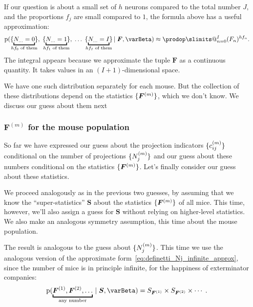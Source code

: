 \documentclass[\ifafour a4paper,12pt,\else a5paper,10pt,\fi%
onecolumn,oneside,article,%
british%
]{memoir}
\makeatletter
\theoremstyle{remark}
\theoremstyle{innote}
\def\prod{\DOTSI\prodop\slimits@}
\newcommand*{\di}{\mathrm{d}}%
\newcommand*{\pf}{\mathrm{p}}%
\renewcommand*{\|}[1][]{\nonscript\,#1\vert\nonscript\;\mathopen{}}
\newcommand*{\yI}{\varBeta}
\newcommand*{\yF}{\bm{F}}
\newcommand*{\yFm}[1][m]{\yF^{(#1)}}
\newcommand*{\yNm}[1][m]{N^{(#1)}}
\newcommand*{\ycm}[1][m]{c^{(#1)}}
\newcommand*{\ySS}{S}
\newcommand*{\yS}{\bm{\ySS}}
\DeclarePairedDelimiter\tu{\{}{\}}
\makeatother
\begin{document}
If our question is about a small set of $h$ neurons compared to the total
number $J$, and the proportions $f_{j}$ are small compared to $1$, the
formula above has a useful approximation:
\begin{equation}
  \label{eq:definetti_Nj_infinite_approx}
  \pf(\tu{\underbracket{N_{\dotso}=0}_{\mathclap{\text{$hf_{0}$ of them}}}},
  \;\tu{\underbracket{N_{\dotso}=1}_{\mathclap{\text{$hf_{1}$ of them}}}},
\;\dotsc
  \;\tu{\underbracket{N_{\dotso}=I}_{\mathclap{\text{$hf_{I}$ of them}}}}
  \| \yF, \yI)
\approx
\prod_{n=0}^{I}(F_{n})^{hf_{n}}.
\end{equation}
The integral appears because we approximate the tuple $\yF$ as a continuous
quantity. It takes values in an $(I+1)$-dimensional space.

\medskip

We have one such distribution separately for each mouse. But the collection
of these distributions depend on the statistics $\tu{\yFm}$, which we don't
know. We discuss our guess about them next


\subsubsection{$\yFm$ for the mouse population}
\label{sec:allmice_exch}

So far we have expressed our guess about the projection indicators
$\tu{\ycm_{ij}}$ conditional on the number of projections $\tu{\yNm_{j}}$
and our guess about these numbers conditional on the statistics
$\tu{\yFm}$. Let's finally consider our guess about these statistics.

We proceed analogously as in the previous two guesses, by assuming that
we know the \enquote{super-statistics} $\yS$ about the statistics
$\tu{\yFm}$ of all mice. This time, however, we'll also assign a guess for
$\yS$ without relying on higher-level statistics. We also make an analogous
symmetry assumption, this time about the mouse population.

The result is analogous to the guess about $\tu{\yNm_{j}}$. This time we
use the analogous version of the approximate
form~\eqref{eq:definetti_Nj_infinite_approx}, since the number of mice is
in principle infinite, for the happiness of exterminator companies:
\begin{equation}
  \label{eq:distr_H_mice}
  \pf( \underbracket{\yFm[1], \yFm[2], \dotsc}_{\text{any number}} \| \yS, \yI) =
  \ySS_{\yFm[1]} \times \ySS_{\yFm[2]} \times \dotsm\;.
\end{equation}
\end{document}
